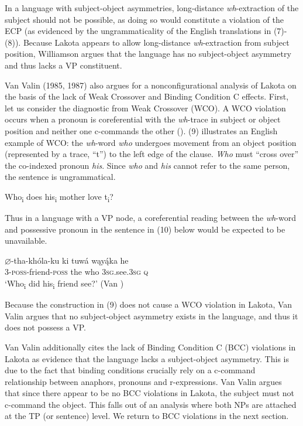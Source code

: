 \documentclass[output=paper]{LSP/langsci}
\begin{document}
In a language with subject-object asymmetries, long-distance \textit{wh}-extraction of the subject should not be possible, as doing so would constitute a violation of the ECP (as evidenced by the ungrammaticality of the English translations in (7)-(8)).  Because Lakota appears to allow long-distance \textit{wh}-extraction from subject position, Williamson argues that the language has no subject-object asymmetry and thus lacks a VP constituent.

Van Valin (1985, 1987) also argues for a nonconfigurational analysis of Lakota on the basis of the lack of Weak Crossover and Binding Condition C effects.  First, let us consider the diagnostic from Weak Crossover (WCO). A WCO violation occurs when a pronoun is coreferential with the \textit{wh}-trace in subject or object position and neither one c-commands the other (\citealt{Sportiche1985}).  (9) illustrates an English example of WCO: the \textit{wh}-word \textit{who} undergoes movement from an object position (represented by a trace, ``t'') to the left edge of the clause. \textit{Who} must ``cross over'' the co-indexed pronoun \textit{his}. Since \textit{who} and \textit{his} cannot refer to the same person, the sentence is ungrammatical. 

\begin{exe}
\ex  *Who\textsubscript{i} does his\textsubscript{i} mother love t\textsubscript{i}?
\end{exe}

Thus in a language with a VP node, a coreferential reading between the \textit{wh}-word and possessive pronoun in the sentence in (10) below would be expected to be unavailable.

\begin{exe}
\ex \gll $\varnothing$-tha-kh\'ola-ku 	ki	tuw\'a	wąy\k{\'a}ka	he \\
3-\textsc{poss}-friend-\textsc{poss} the who		\textsc{3sg}.see.\textsc{3sg} 	\textsc{q} \\
\trans `Who\textsubscript{i} did his\textsubscript{i}  friend see?' (Van \citealt[379]{Valin1987})
\end{exe}

Because the construction in (9) does not cause a WCO violation in Lakota, Van Valin argues that no subject-object asymmetry exists in the language, and thus it does not possess a VP.
	
Van Valin additionally cites the lack of Binding Condition C (BCC) violations in Lakota as evidence that the language lacks a subject-object asymmetry.  This is due to the fact that binding conditions crucially rely on a c-command relationship between anaphors, pronouns and r-expressions.  Van Valin argues that since there appear to be no BCC violations in Lakota, the subject must not c-command the object. This falls out of an analysis where both NPs are attached at the TP (or sentence) level. We return to BCC violations in the next section.
\end{document}

